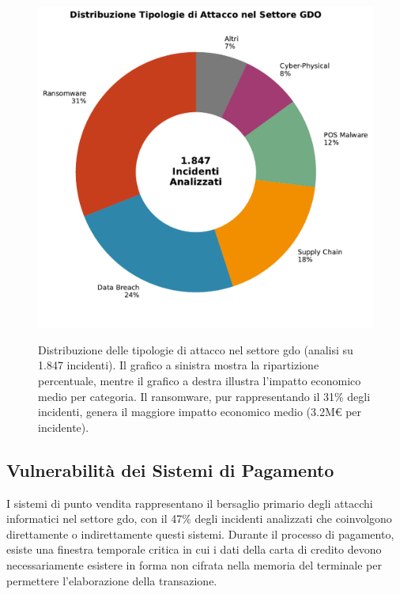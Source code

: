 \begin{figure}[htbp]
\centering
\includegraphics[width=\textwidth]{thesis_figures/cap2/fig_2_2_attack_types.pdf}
\caption{Distribuzione delle tipologie di attacco nel settore \gls{gdo} (analisi su 1.847 incidenti). Il grafico a sinistra mostra la ripartizione percentuale, mentre il grafico a destra illustra l'impatto economico medio per categoria. Il \gls{ransomware}, pur rappresentando il 31\% degli incidenti, genera il maggiore impatto economico medio (3.2M€ per incidente).}\autocite{CPR2025}
\label{fig:attack_types}
\end{figure}

\subsection{\texorpdfstring{Vulnerabilità dei Sistemi di Pagamento}{2.3.1 - Vulnerabilità dei Sistemi di Pagamento}}

I sistemi di punto vendita rappresentano il bersaglio primario degli attacchi informatici nel settore \gls{gdo}, con il 47\% degli incidenti analizzati che coinvolgono direttamente o indirettamente questi sistemi. Durante il processo di pagamento, esiste una finestra temporale critica in cui i dati della carta di credito devono necessariamente esistere in forma non cifrata nella memoria del terminale per permettere l'elaborazione della transazione.

